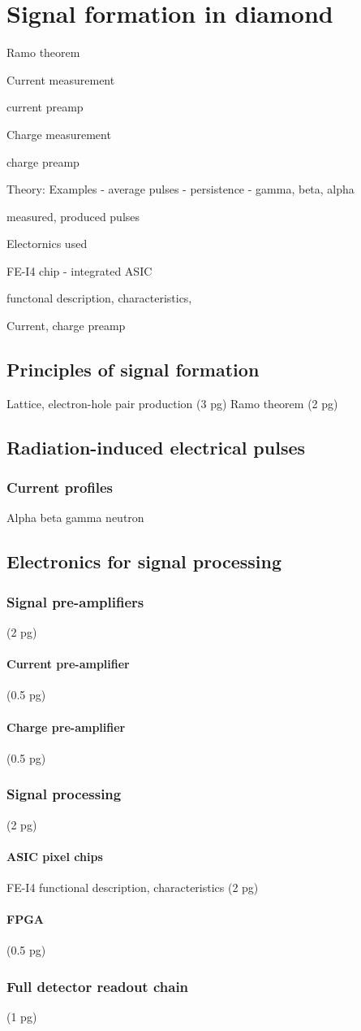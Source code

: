 \chapter{Signal formation in diamond}
Ramo theorem

Current measurement

current preamp

Charge measurement

charge preamp

Theory: Examples - average pulses - persistence - gamma, beta, alpha		

measured, produced pulses

Electornics used

FE-I4 chip - integrated ASIC

functonal description, characteristics,

Current, charge preamp


\section{Principles of signal formation}
Lattice, electron-hole pair production (3 pg)
Ramo theorem (2 pg)

\section{Radiation-induced electrical pulses}
\subsection{Current profiles}
Alpha
beta
gamma
neutron

\section{Electronics for signal processing}
\subsection{Signal pre-amplifiers}
(2 pg)
\subsubsection{Current pre-amplifier}
(0.5 pg)
\subsubsection{Charge pre-amplifier}
(0.5 pg)
\subsection{Signal processing}
(2 pg)
\subsubsection{ASIC pixel chips}
FE-I4 functional description, characteristics
 (2 pg)
\subsubsection{FPGA}
(0.5 pg)
\subsection{Full detector readout chain}
(1 pg)
